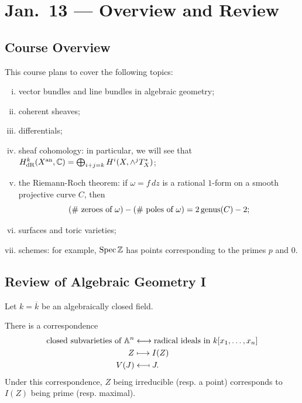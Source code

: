 \chapter{Jan.~13 --- Overview and Review}

\section{Course Overview}

\begin{remark}
  This course plans to cover the following
  topics:
  \begin{enumerate}[(i)]
    \item vector bundles and line
      bundles in algebraic geometry;
    \item coherent sheaves;
    \item differentials;
    \item sheaf cohomology: in
      particular, we will see that
      $H^k_{\mathrm{dR}}(X^{\mathrm{an}}, \mathbb{C}) = \bigoplus_{i + j = k} H^i(X, \wedge^j T_X^*)$;
    \item the Riemann-Roch theorem:
      if $\omega = f\, dz$ is a rational
      $1$-form on a smooth
      projective curve $C$, then
      \[
        (\# \text{ zeroes of } \omega)
        - (\# \text{ poles of } \omega)
        = 2 \operatorname{genus}(C) - 2;
      \]
    \item surfaces and toric varieties;
    \item schemes: for example,
      $\operatorname{Spec} \mathbb{Z}$ has points
      corresponding to the primes $p$
      and $0$.
  \end{enumerate}
\end{remark}

\section{Review of Algebraic Geometry I}

\begin{remark}
  Let $k = \overline{k}$ be an
  algebraically closed field.
\end{remark}

\begin{remark}
  There is a correspondence
  \begin{align*}
    \text{closed subvarieties of $\Affine^n$}
    &\longleftrightarrow
    \text{radical ideals in $k[x_1, \dots, x_n]$} \\
    Z &\longmapsto I(Z) \\
    V(J) &\mathrel{\reflectbox{\ensuremath{\longmapsto}}} J.
  \end{align*}
  Under this correspondence,
  $Z$ being
  irreducible (resp. a point)
  corresponds to $I(Z)$ being
  prime (resp. maximal).
\end{remark}

